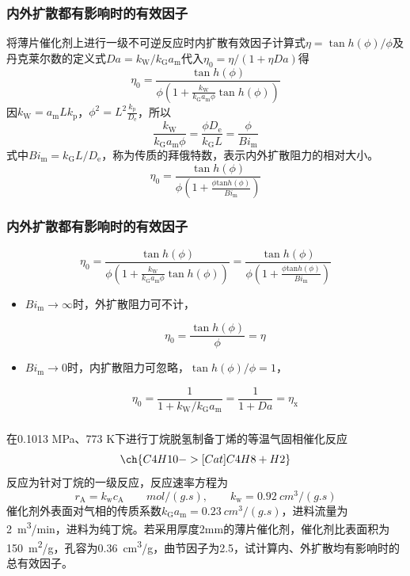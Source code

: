 \begin{frame}
    \frametitle{内外扩散都有影响时的有效因子}

    将薄片催化剂上进行一级不可逆反应时内扩散有效因子计算式$\eta = \tan h(\phi)/\phi$及丹克莱尔数的定义式$Da = k_{\mathrm{W}}/{k_{\mathrm{G}} a_{\mathrm{m}}}$代入$\eta_{0}=\eta /(1+\eta D a)$得
    \[
        \eta_{0}=\frac{\tan h(\phi)}{\phi (1+\frac{k_{\mathrm{W}}}{k_{\mathrm{G}} a_{\mathrm{m}} \phi} \tan h(\phi))}
    \]
    因$k_{\mathrm{W}} = a_{\mathrm{m}} L k_{\mathrm{p}}$，$\phi ^2 = L^2 \frac{k_{\mathrm{p}}}{D_{\mathrm{e}}}$，所以
    \[
        \frac{k_{\mathrm{W}}}{k_{\mathrm{G}} a_{\mathrm{m}} \phi}=\frac{\phi D_{\mathrm{e}}}{k_{\mathrm{G}} L}=\frac{\phi}{B i_{\mathrm{m}}}
    \]
    式中$B i_{\mathrm{m}} = k_{\mathrm{G}} L/D_{\mathrm{e}}$，称为传质的拜俄特数，表示内外扩散阻力的相对大小。
    \[
        \eta_{0}=\frac{\tan h(\phi)}{\phi\left(1+\frac{\phi \mathrm{tan} h(\phi)}{B i_{\mathrm{m}}}\right)}
    \]
    

\end{frame}


\begin{frame}
    \frametitle{内外扩散都有影响时的有效因子}

    \[
        \eta_{0}=\frac{\tan h(\phi)}{\phi (1+\frac{k_{\mathrm{W}}}{k_{\mathrm{G}} a_{\mathrm{m}} \phi} \tan h(\phi))}=\frac{\tan h(\phi)}{\phi\left(1+\frac{\phi \mathrm{tan} h(\phi)}{B i_{\mathrm{m}}}\right)}
    \]
    \begin{itemize}
        \item $B i_{\mathrm{m}} \to \infty$时，外扩散阻力可不计，
        
        \[
            \eta_{0}= \frac{\tan h(\phi)}{\phi} = \eta
        \]
        \item $B i_{\mathrm{m}} \to 0$时，内扩散阻力可忽略，$\tan h(\phi)/{\phi} =1$，
        
        \[
            \eta_{0}= \frac{1}{1 + k_{\mathrm{W}}/k_{\mathrm{G}} a_{\mathrm{m}}} = \frac{1}{1 + Da} = \eta_ \mathrm{x}
        \]
    \end{itemize}

\end{frame}


\begin{frame}[t]
    \frametitle{}

    \begin{example}
        在0.1013 MPa、773 K下进行丁烷脱氢制备丁烯的等温气固相催化反应
        \[
            \ch{C4H10 ->[Cat] C4H8 + H2}
        \]
        反应为针对丁烷的一级反应，反应速率方程为
        \[
            r_\mathrm{A} = k_\mathrm{w} c_\mathrm{A} \qquad \si{mol/(g.s)}, \qquad k_\mathrm{w} = \SI{0.92}{cm^3/(g.s)}
        \]
        催化剂外表面对气相的传质系数$k_{\mathrm{G}} a_{\mathrm{m}} = \SI{0.23}{cm^3/(g.s)}$，进料流量为\SI{2}{m^3/min}，进料为纯丁烷。若采用厚度2mm的薄片催化剂，催化剂比表面积为\SI{150}{m^2/g}，孔容为\SI{0.36}{cm^3/g}，曲节因子为2.5，试计算内、外扩散均有影响时的总有效因子。
    \end{example}

\end{frame}

